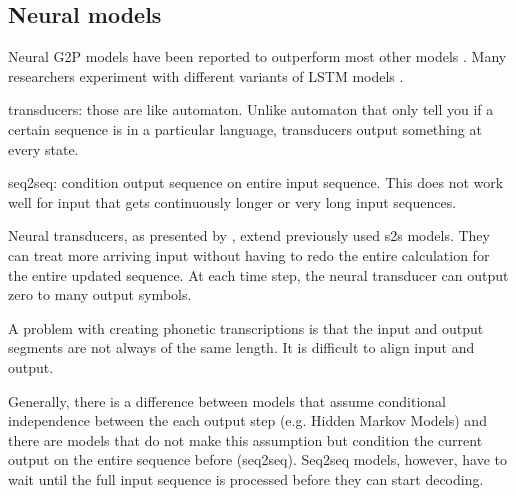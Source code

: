 \subsection{Neural models}
Neural G2P models have been reported to outperform most other models \citep{Lee&Ashby.2020}. Many researchers experiment with different variants of LSTM models \citep{Lee&Ashby.2020, hammond-2021-data, gautam.2021}. 

transducers: those are like automaton. Unlike automaton that only tell you if a certain sequence is in a particular language, transducers output something at every state. 

seq2seq: condition output sequence on entire input sequence. This does not work well for input that gets continuously longer or very long input sequences. 

Neural transducers, as presented by \citet{jaitly2016neural}, extend previously used \ac{s2s} models. They can treat more arriving input without having to redo the entire calculation for the entire updated sequence. At each time step, the neural transducer can output zero to many output symbols. 


A problem with creating phonetic transcriptions is that the input and output segments are not always of the same length. It is difficult to align input and output. 


Generally, there is a difference between models that assume conditional independence between the each output step (e.g. Hidden Markov Models) and there are models that do not make this assumption but condition the current output on the entire sequence before (seq2seq). Seq2seq models, however, have to wait until the full input sequence is processed before they can start decoding.  
